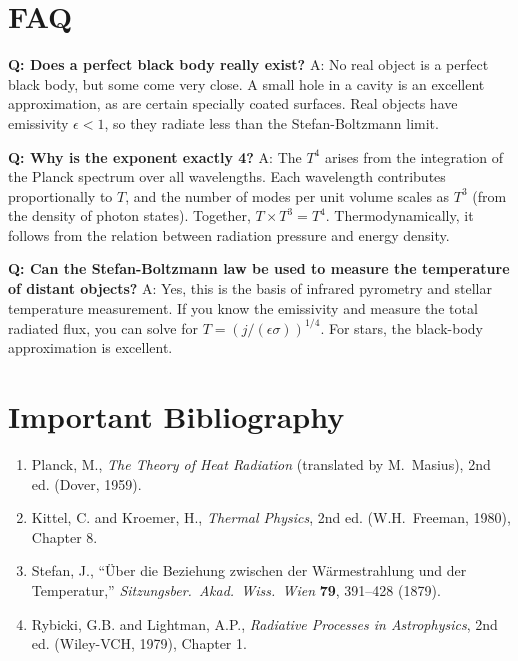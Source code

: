 \section*{FAQ}

\textbf{Q: Does a perfect black body really exist?}
A: No real object is a perfect black body, but some come very close. A small hole in a cavity is an excellent approximation, as are certain specially coated surfaces. Real objects have emissivity $\epsilon < 1$, so they radiate less than the Stefan-Boltzmann limit.

\textbf{Q: Why is the exponent exactly 4?}
A: The $T^4$ arises from the integration of the Planck spectrum over all wavelengths. Each wavelength contributes proportionally to $T$, and the number of modes per unit volume scales as $T^3$ (from the density of photon states). Together, $T \times T^3 = T^4$. Thermodynamically, it follows from the relation between radiation pressure and energy density.

\textbf{Q: Can the Stefan-Boltzmann law be used to measure the temperature of distant objects?}
A: Yes, this is the basis of infrared pyrometry and stellar temperature measurement. If you know the emissivity and measure the total radiated flux, you can solve for $T = (j/(\epsilon\sigma))^{1/4}$. For stars, the black-body approximation is excellent.
\section*{Important Bibliography}

\begin{enumerate}
\item Planck, M., \textit{The Theory of Heat Radiation} (translated by M.\ Masius), 2nd ed. (Dover, 1959).
\item Kittel, C. and Kroemer, H., \textit{Thermal Physics}, 2nd ed. (W.H.\ Freeman, 1980), Chapter 8.
\item Stefan, J., ``\"{U}ber die Beziehung zwischen der W\"{a}rmestrahlung und der Temperatur,'' \textit{Sitzungsber.\ Akad.\ Wiss.\ Wien} \textbf{79}, 391--428 (1879).
\item Rybicki, G.B. and Lightman, A.P., \textit{Radiative Processes in Astrophysics}, 2nd ed. (Wiley-VCH, 1979), Chapter 1.
\end{enumerate}

